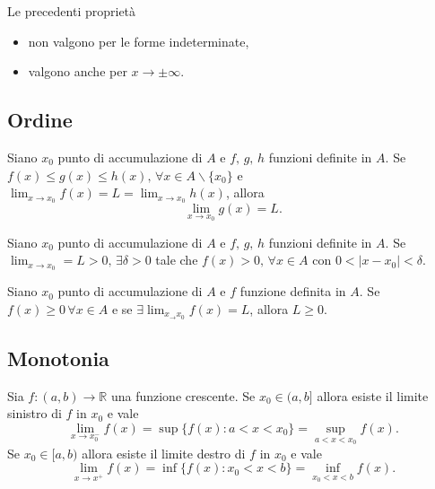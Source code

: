 Le precedenti proprietà
\begin{itemize}
    \item non valgono per le forme indeterminate,
    \item valgono anche per $x\rightarrow\pm\infty$.
\end{itemize}

\subsection{Ordine}

\begin{theorem}\label{th:dei_carabinieri}
    Siano $x_0$ punto di accumulazione di $A$ e $f,\, g,\, h$ funzioni definite in $A$. Se $f(x)\leq g(x)\leq h(x),\, \forall x\in A\backslash\{x_0\}$ e $\lim_{x\rightarrow x_0}f(x)=L=\lim_{x\rightarrow x_0} h(x)$, allora
    \begin{equation*}
        \lim_{x\rightarrow x_0} g(x)=L.
    \end{equation*}
\end{theorem}

\begin{theorem}
    Siano $x_0$ punto di accumulazione di $A$ e $f,\, g,\, h$ funzioni definite in $A$. Se $\lim_{x\rightarrow x_0}=L>0,\, \exists\delta>0$ tale che $f(x)>0,\, \forall x\in A$ con $0<|x-x_0|<\delta$.
\end{theorem}

\begin{theorem}
    Siano $x_0$ punto di accumulazione di $A$ e $f$ funzione definita in $A$.
    Se $f(x)\geq 0\, \forall x\in A$ e se $\exists\lim_{x_\rightarrow x_0}f(x)=L$, allora $L\geq 0$.
\end{theorem}

\subsection{Monotonia}
\begin{proposition}\label{prop:monotonia_limiti}
    Sia $f\colon (a,b)\rightarrow\mathbb R$ una funzione crescente.
    Se $x_0\in(a,b]$ allora esiste il limite sinistro di $f$ in $x_0$ e vale
    \begin{equation*}
        \lim_{x\rightarrow x_0^-}f(x)=\sup\{f(x)\colon a<x<x_0\}=\underset{a<x<x_0}{\sup} f(x).
    \end{equation*}
    Se $x_0\in[a,b)$ allora esiste il limite destro di $f$ in $x_0$ e vale
    \begin{equation*}
        \lim_{x\rightarrow x^+}f(x)=\inf\{f(x)\colon x_0<x<b\}=\underset{x_0<x<b}{\inf}f(x).
    \end{equation*}
\end{proposition}

